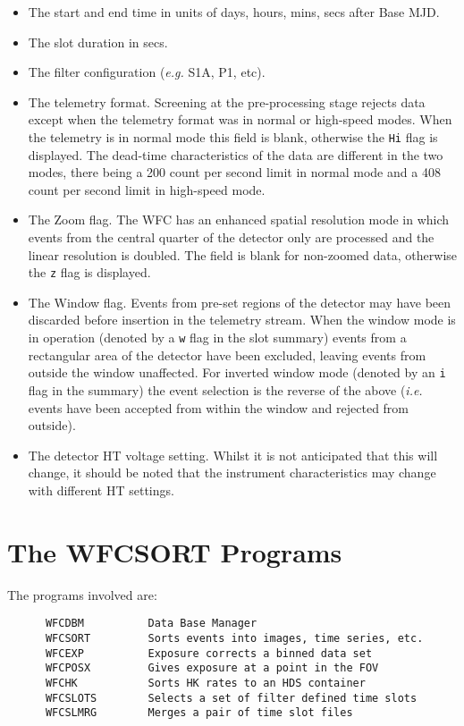 \begin{itemize}
\item
The start and end time in units of days, hours, mins, secs after Base MJD.
\item
The slot duration in secs.
\item
The filter configuration ({\it e.g.} S1A, P1, etc).
\item
The telemetry format. Screening at the pre-processing stage rejects data except
when the telemetry format was in normal or high-speed
modes. When the telemetry is in normal mode this field is blank,
otherwise the {\tt Hi} flag is displayed. The dead-time characteristics of 
the data are different in the two modes, there being a 200 count per second 
limit in normal mode and a 408 count per second limit in high-speed mode.
\item
The Zoom flag. The WFC has an enhanced spatial resolution mode in
which events from the central quarter of the detector only are
processed and the linear resolution is doubled. The field is blank
for non-zoomed data, otherwise the {\tt z} flag is displayed.
\item
The Window flag. Events from pre-set regions of the detector may have been
discarded before insertion in the telemetry
stream. When the window mode is in operation (denoted by a {\tt w} flag in
the slot summary) events from a rectangular area of the detector
have been excluded, leaving events from outside the window unaffected. For
inverted window mode (denoted by an {\tt i} flag in the summary) the event
selection is the reverse of the above ({\it i.e.} events have been accepted
from within the window and rejected from outside).
\item
The detector HT voltage setting. Whilst it is not anticipated that this
will change, it should be noted that the instrument
characteristics may change with different HT settings.
\end{itemize}

\section{The WFCSORT Programs}
\label{se:progs}

The programs involved are:
\begin{verbatim}
      WFCDBM          Data Base Manager
      WFCSORT         Sorts events into images, time series, etc.
      WFCEXP          Exposure corrects a binned data set
      WFCPOSX         Gives exposure at a point in the FOV
      WFCHK           Sorts HK rates to an HDS container
      WFCSLOTS        Selects a set of filter defined time slots
      WFCSLMRG        Merges a pair of time slot files
\end{verbatim}

